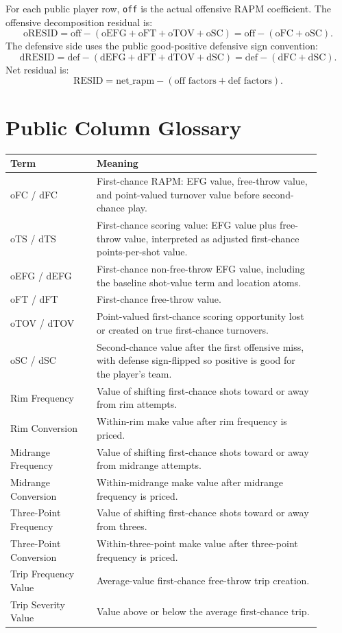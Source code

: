 \documentclass[11pt]{article}
\begin{document}
For each public player row, \texttt{off} is the actual offensive RAPM
coefficient.  The offensive decomposition residual is:
\[
\text{oRESID}
= \text{off}
- (\text{oEFG}+\text{oFT}+\text{oTOV}+\text{oSC})
= \text{off} - (\text{oFC}+\text{oSC}).
\]
The defensive side uses the public good-positive defensive sign convention:
\[
\text{dRESID}
= \text{def}
- (\text{dEFG}+\text{dFT}+\text{dTOV}+\text{dSC})
= \text{def} - (\text{dFC}+\text{dSC}).
\]
Net residual is:
\[
\text{RESID}
= \text{net\_rapm}
- (\text{off factors}+\text{def factors}).
\]

\section{Public Column Glossary}

\begin{longtable}{p{0.25\linewidth}p{0.65\linewidth}}
\toprule
Term & Meaning\\
\midrule
oFC / dFC & First-chance RAPM: EFG value, free-throw value, and point-valued turnover value before second-chance play.\\
oTS / dTS & First-chance scoring value: EFG value plus free-throw value, interpreted as adjusted first-chance points-per-shot value.\\
oEFG / dEFG & First-chance non-free-throw EFG value, including the baseline shot-value term and location atoms.\\
oFT / dFT & First-chance free-throw value.\\
oTOV / dTOV & Point-valued first-chance scoring opportunity lost or created on true first-chance turnovers.\\
oSC / dSC & Second-chance value after the first offensive miss, with defense sign-flipped so positive is good for the player's team.\\
Rim Frequency & Value of shifting first-chance shots toward or away from rim attempts.\\
Rim Conversion & Within-rim make value after rim frequency is priced.\\
Midrange Frequency & Value of shifting first-chance shots toward or away from midrange attempts.\\
Midrange Conversion & Within-midrange make value after midrange frequency is priced.\\
Three-Point Frequency & Value of shifting first-chance shots toward or away from threes.\\
Three-Point Conversion & Within-three-point make value after three-point frequency is priced.\\
Trip Frequency Value & Average-value first-chance free-throw trip creation.\\
Trip Severity Value & Value above or below the average first-chance trip.\\
\bottomrule
\end{longtable}
\end{document}
